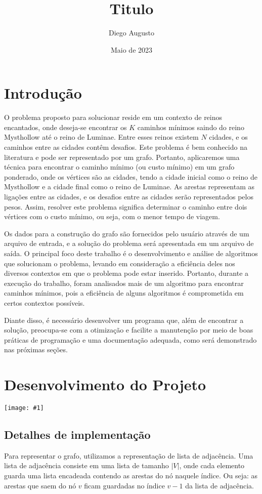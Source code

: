 \documentclass[12pt]{article}
\title{Titulo}
\date{Maio de 2023}
\author{Diego Augusto}
\newcommand\image[1]{\noindent\texttt{[image: \#1]}}
\begin{document}

    \maketitle
    \newpage
    \section{Introdução}
    O problema proposto para solucionar reside em um contexto de reinos
    encantados, onde deseja-se encontrar os $K$ caminhos mínimos saindo do reino Mysthollow até o reino de Luminae. Entre esses
    reinos existem $N$ cidades, e os caminhos entre as cidades contêm desafios. Este
    problema é bem conhecido na literatura e pode ser representado por um grafo.
    Portanto, aplicaremos uma técnica para encontrar o caminho mínimo (ou custo
    mínimo) em um grafo ponderado, onde os vértices são as cidades, tendo a
    cidade inicial como o reino de Mysthollow e a cidade final como o reino de
    Luminae. As arestas representam as ligações entre as cidades, e os desafios
    entre as cidades serão representados pelos pesos. Assim, resolver este
    problema significa determinar o caminho entre dois vértices com o custo
    mínimo, ou seja, com o menor tempo de viagem.

    Os dados para a construção do grafo são fornecidos pelo usuário através de um
    arquivo de entrada, e a solução do problema será apresentada em um arquivo de
    saída. O principal foco deste trabalho é o desenvolvimento e análise de
    algoritmos que solucionam o problema, levando em consideração a eficiência deles
    nos diversos contextos em que o problema pode estar inserido. Portanto, durante
    a execução do trabalho, foram analisados mais de um algoritmo para encontrar
    caminhos mínimos, pois a eficiência de alguns algoritmos é comprometida em
    certos contextos possíveis.

    Diante disso, é necessário desenvolver um programa que, além de encontrar a
    solução, preocupa-se com a otimização e facilite a manutenção por meio de boas
    práticas de programação e uma documentação adequada, como será demonstrado nas
    próximas seções.
    \section{Desenvolvimento do Projeto}

    \image{fluxo}

    \subsection{Detalhes de implementação}
    Para representar o grafo, utilizamos a representação de lista de adjacência.
    Uma lista de adjacência consiste em uma lista de tamanho $|V|$, onde cada
    elemento guarda uma lista encadeada contendo as arestas do nó naquele
    índice. Ou seja: as arestas que saem do nó $v$ ficam guardadas no índice
    $v-1$ da lista de adjacência.
\end{document}
